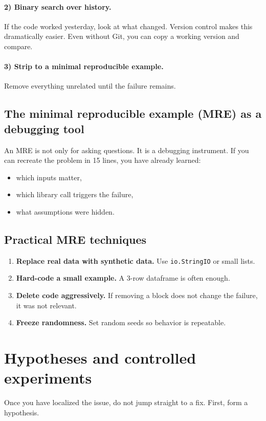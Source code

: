 \paragraph{2) Binary search over history.} If the code worked yesterday, look at what changed. Version control makes this dramatically easier. Even without Git, you can copy a working version and compare.

\paragraph{3) Strip to a minimal reproducible example.} Remove everything unrelated until the failure remains.

\subsection{The minimal reproducible example (MRE) as a debugging tool}
An MRE is not only for asking questions. It is a debugging instrument. If you can recreate the problem in 15 lines, you have already learned:
\begin{itemize}[noitemsep]
  \item which inputs matter,
  \item which library call triggers the failure,
  \item what assumptions were hidden.
\end{itemize}

\subsection{Practical MRE techniques}
\begin{enumerate}[noitemsep]
  \item \textbf{Replace real data with synthetic data.} Use \texttt{io.StringIO} or small lists.
  \item \textbf{Hard-code a small example.} A 3-row dataframe is often enough.
  \item \textbf{Delete code aggressively.} If removing a block does not change the failure, it was not relevant.
  \item \textbf{Freeze randomness.} Set random seeds so behavior is repeatable.
\end{enumerate}

\section{Hypotheses and controlled experiments}
Once you have localized the issue, do not jump straight to a fix. First, form a hypothesis.

